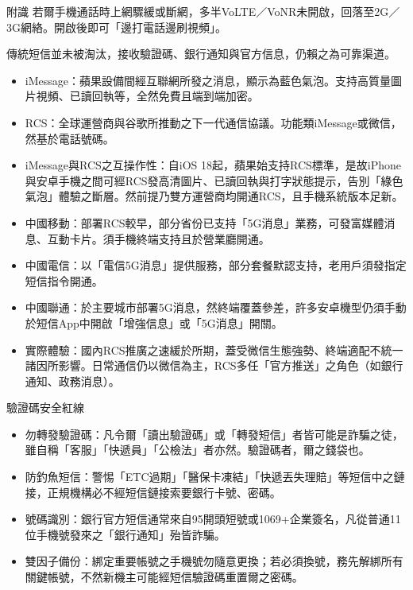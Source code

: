 \begin{tcbinfo}{附識}
若爾手機通話時上網驟緩或斷網，多半VoLTE／VoNR未開啟，回落至2G／3G網絡。開啟後即可「邊打電話邊刷視頻」。

\end{tcbinfo}


傳統短信並未被淘汰，接收驗證碼、銀行通知與官方信息，仍賴之為可靠渠道。

\begin{itemize}
  \item iMessage：蘋果設備間經互聯網所發之消息，顯示為藍色氣泡。支持高質量圖片視頻、已讀回執等，全然免費且端到端加密。
  \item RCS：全球運營商與谷歌所推動之下一代通信協議。功能類iMessage或微信，然基於電話號碼。
  \item iMessage與RCS之互操作性：自iOS 18起，蘋果始支持RCS標準，是故iPhone與安卓手機之間可經RCS發高清圖片、已讀回執與打字狀態提示，告別「綠色氣泡」體驗之斷層。然前提乃雙方運營商均開通RCS，且手機系統版本足新。
\end{itemize}


\begin{itemize}
  \item 中國移動：部署RCS較早，部分省份已支持「5G消息」業務，可發富媒體消息、互動卡片。須手機終端支持且於營業廳開通。
  \item 中國電信：以「電信5G消息」提供服務，部分套餐默認支持，老用戶須發指定短信指令開通。
  \item 中國聯通：於主要城市部署5G消息，然終端覆蓋參差，許多安卓機型仍須手動於短信App中開啟「增強信息」或「5G消息」開關。
  \item 實際體驗：國內RCS推廣之速緩於所期，蓋受微信生態強勢、終端適配不統一諸因所影響。日常通信仍以微信為主，RCS多任「官方推送」之角色（如銀行通知、政務消息）。
\end{itemize}

\begin{tcbwarn}{驗證碼安全紅線}
\begin{itemize}
  \item 勿轉發驗證碼：凡令爾「讀出驗證碼」或「轉發短信」者皆可能是詐騙之徒，雖自稱「客服」「快遞員」「公檢法」者亦然。驗證碼者，爾之錢袋也。
  \item 防釣魚短信：警惕「ETC過期」「醫保卡凍結」「快遞丟失理賠」等短信中之鏈接，正規機構必不經短信鏈接索要銀行卡號、密碼。
  \item 號碼識別：銀行官方短信通常來自95開頭短號或1069+企業簽名，凡從普通11位手機號發來之「銀行通知」殆皆詐騙。
  \item 雙因子備份：綁定重要帳號之手機號勿隨意更換；若必須換號，務先解綁所有關鍵帳號，不然新機主可能經短信驗證碼重置爾之密碼。
\end{itemize}

\end{tcbwarn}

